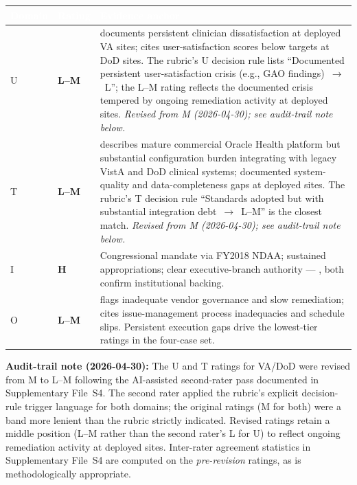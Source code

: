 \begin{table}[H]
\footnotesize
\begin{tabular}{p{1.2cm} >{\centering\arraybackslash}p{1.4cm} p{12.5cm}}
\toprule
\rowcolor{headerblue}
\textcolor{white}{\textbf{Domain}} &
\textcolor{white}{\textbf{Rating}} &
\textcolor{white}{\textbf{Evidence anchor}} \\
\midrule
\rowcolor{rowgray}
U & \cellcolor{lowred}\textcolor{lowredtext}{\textbf{L--M}} &
\cite{gao2025vaehr} documents persistent clinician dissatisfaction at deployed VA sites; \cite{gao2024dodehr} cites user-satisfaction scores below targets at DoD sites. The rubric's U decision rule lists ``Documented persistent user-satisfaction crisis (e.g., GAO findings)~$\rightarrow$~L''; the L--M rating reflects the documented crisis tempered by ongoing remediation activity at deployed sites. \textit{Revised from M (2026-04-30); see audit-trail note below.} \\
T & \cellcolor{lowred}\textcolor{lowredtext}{\textbf{L--M}} &
\cite{gao2025vaehr} describes mature commercial Oracle Health platform but substantial configuration burden integrating with legacy VistA and DoD clinical systems; documented system-quality and data-completeness gaps at deployed sites. The rubric's T decision rule ``Standards adopted but with substantial integration debt~$\rightarrow$~L--M'' is the closest match. \textit{Revised from M (2026-04-30); see audit-trail note below.} \\
\rowcolor{rowgray}
I & \cellcolor{highgreen}\textcolor{highgreentext}{\textbf{H}} &
Congressional mandate via FY2018 NDAA; sustained appropriations; clear executive-branch authority --- \cite{gao2025vaehr}, \cite{gao2024dodehr} both confirm institutional backing. \\
O & \cellcolor{lowred}\textcolor{lowredtext}{\textbf{L--M}} &
\cite{gao2025vaehr} flags inadequate vendor governance and slow remediation; \cite{gao2024dodehr} cites issue-management process inadequacies and schedule slips. Persistent execution gaps drive the lowest-tier ratings in the four-case set. \\
\bottomrule
\end{tabular}
\end{table}

\smallskip
\noindent\textbf{Audit-trail note (2026-04-30):} The U and T ratings for VA/DoD were revised from M to L--M following the AI-assisted second-rater pass documented in Supplementary File~S4. The second rater applied the rubric's explicit decision-rule trigger language for both domains; the original ratings (M for both) were a band more lenient than the rubric strictly indicated. Revised ratings retain a middle position (L--M rather than the second rater's L for U) to reflect ongoing remediation activity at deployed sites. Inter-rater agreement statistics in Supplementary File~S4 are computed on the \textit{pre-revision} ratings, as is methodologically appropriate.

